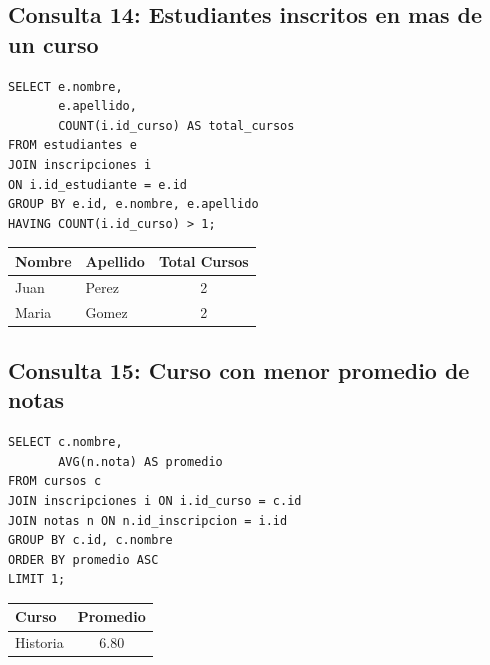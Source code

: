\documentclass[12pt,a4paper]{article}
\begin{document}
\subsection{Consulta 14: Estudiantes inscritos en mas de un curso}

\begin{lstlisting}
SELECT e.nombre,
       e.apellido,
       COUNT(i.id_curso) AS total_cursos
FROM estudiantes e
JOIN inscripciones i
ON i.id_estudiante = e.id
GROUP BY e.id, e.nombre, e.apellido
HAVING COUNT(i.id_curso) > 1;
\end{lstlisting}

\begin{center}
\begin{tabular}{|l|l|c|}
\hline
Nombre & Apellido & Total Cursos \\
\hline
Juan & Perez & 2 \\
Maria & Gomez & 2 \\
\hline
\end{tabular}
\end{center}


\subsection{Consulta 15: Curso con menor promedio de notas}

\begin{lstlisting}
SELECT c.nombre,
       AVG(n.nota) AS promedio
FROM cursos c
JOIN inscripciones i ON i.id_curso = c.id
JOIN notas n ON n.id_inscripcion = i.id
GROUP BY c.id, c.nombre
ORDER BY promedio ASC
LIMIT 1;
\end{lstlisting}

\begin{center}
\begin{tabular}{|l|c|}
\hline
Curso & Promedio \\
\hline
Historia & 6.80 \\
\hline
\end{tabular}
\end{center}
\end{document}
